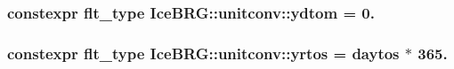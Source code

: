 \subsubsection[{ydtom}]{\setlength{\rightskip}{0pt plus 5cm}constexpr {\bf flt\+\_\+type} Ice\+B\+R\+G\+::unitconv\+::ydtom = 0.}\label{namespaceIceBRG_1_1unitconv_a470ebb18fe144ca40ff0fb7b40550af1}
\hypertarget{namespaceIceBRG_1_1unitconv_af7d69d955e539febbb036cedaf1526c8}{}
\subsubsection[{yrtos}]{\setlength{\rightskip}{0pt plus 5cm}constexpr {\bf flt\+\_\+type} Ice\+B\+R\+G\+::unitconv\+::yrtos = {\bf daytos} $\ast$ 365.}\label{namespaceIceBRG_1_1unitconv_af7d69d955e539febbb036cedaf1526c8}
